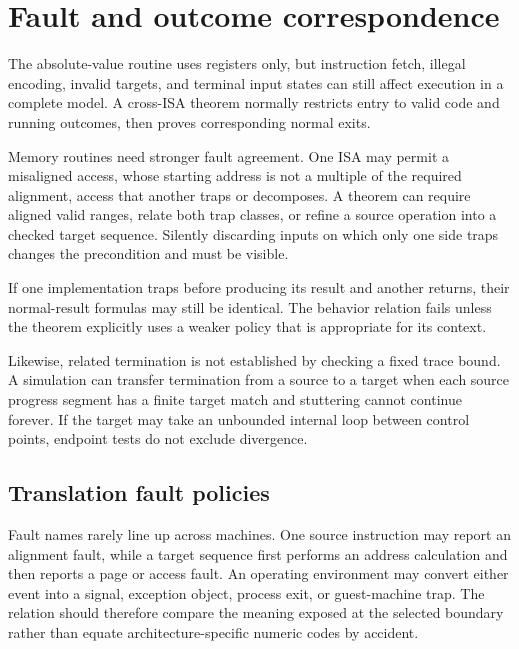 \section{Fault and outcome correspondence}

The absolute-value routine uses registers only, but instruction fetch, illegal
encoding, invalid targets, and terminal input states can still affect execution
in a complete model. A cross-ISA theorem normally restricts entry to valid
code and running outcomes, then proves corresponding normal exits.

Memory routines need stronger fault agreement. One ISA may permit a
misaligned access, whose starting address is not a multiple of the required
alignment,
access that another traps or decomposes. A theorem can require aligned valid
ranges, relate both trap classes, or refine a source operation into a checked
target sequence. Silently discarding inputs on which only one side traps
changes the precondition and must be visible.

\begin{warning}[title={Shared normal results do not repair unequal faults}]
If one implementation traps before producing its result and another returns,
their normal-result formulas may still be identical. The behavior
relation fails unless the theorem explicitly uses a weaker policy that is
appropriate for its context.
\end{warning}

Likewise, related termination is not established by checking a fixed trace
bound. A simulation can transfer termination from a source to a target when
each source progress segment has a finite target match and stuttering cannot
continue forever. If the target may take an unbounded internal loop between
control points, endpoint tests do not exclude divergence.

\subsection{Translation fault policies}

Fault names rarely line up across machines. One source instruction may report
an alignment fault, while a target sequence first performs an address
calculation and then reports a page or access fault. An operating environment
may convert either event into a signal, exception object, process exit, or
guest-machine trap. The relation should therefore compare the meaning exposed
at the selected boundary rather than equate architecture-specific numeric
codes by accident.

